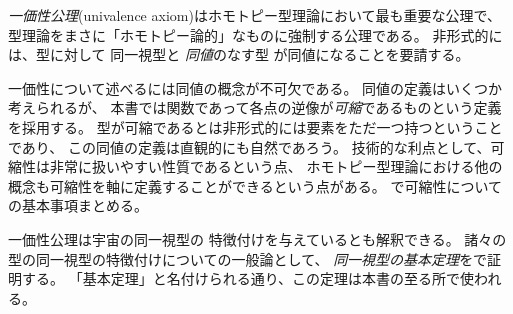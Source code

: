 \documentclass[index]{subfiles}
\begin{document}

\emph{一価性公理}(univalence axiom)はホモトピー型理論において最も重要な公理で、
型理論をまさに「ホモトピー論的」なものに強制する公理である。
非形式的には、型に対して
同一視型と
\emph{同値}のなす型
が同値になることを要請する。

一価性について述べるには同値の概念が不可欠である。
同値の定義はいくつか考えられるが、
本書では関数であって各点の逆像が\emph{可縮}であるものという定義を採用する。
型が可縮であるとは非形式的には要素をただ一つ持つということであり、
この同値の定義は直観的にも自然であろう。
技術的な利点として、可縮性は非常に扱いやすい性質であるという点、
ホモトピー型理論における他の概念も可縮性を軸に定義することができるという点がある。
で可縮性についての基本事項まとめる。

一価性公理は宇宙の同一視型の
特徴付けを与えているとも解釈できる。
諸々の型の同一視型の特徴付けについての一般論として、
\emph{同一視型の基本定理}をで証明する。
「基本定理」と名付けられる通り、この定理は本書の至る所で使われる。

\begin{mySubsections}
  
  
  
  
  
  
\end{mySubsections}
\end{document}
